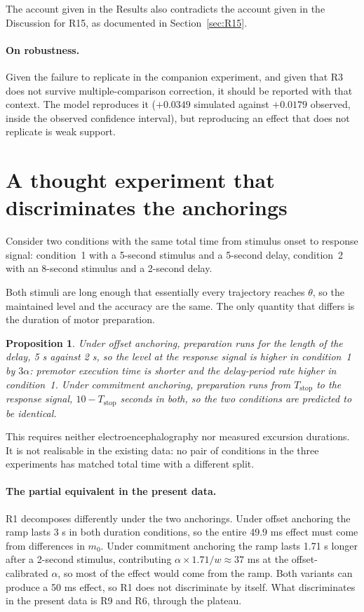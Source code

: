 \documentclass[11pt,a4paper]{article}
\newcommand{\Tstop}{T_{\text{stop}}}
\theoremstyle{plain}
\newtheorem{proposition}{Proposition}
\theoremstyle{remark}
\begin{document}
The account given in the Results also contradicts the account given in the Discussion for
R15, as documented in Section~\ref{sec:R15}.

\paragraph{On robustness.} Given the failure to replicate in the companion experiment, and
given that R3 does not survive multiple-comparison correction, it should be reported with
that context. The model reproduces it ($+0.0349$ simulated against $+0.0179$ observed,
inside the observed confidence interval), but reproducing an effect that does not replicate
is weak support.

\section{A thought experiment that discriminates the anchorings}
\label{sec:thought}

Consider two conditions with the same total time from stimulus onset to response signal:
condition~1 with a 5-second stimulus and a 5-second delay, condition~2 with an 8-second
stimulus and a 2-second delay.

Both stimuli are long enough that essentially every trajectory reaches $\theta$, so the
maintained level and the accuracy are the same. The only quantity that differs is the
duration of motor preparation.

\begin{proposition}
\label{prop:thought}
Under offset anchoring, preparation runs for the length of the delay, 5 s against 2 s, so
the level at the response signal is higher in condition~1 by $3\alpha$: premotor execution
time is shorter and the delay-period rate higher in condition~1. Under commitment anchoring,
preparation runs from $\Tstop$ to the response signal, $10-\Tstop$ seconds in both, so the
two conditions are predicted to be identical.
\end{proposition}

This requires neither electroencephalography nor measured excursion durations. It is not
realisable in the existing data: no pair of conditions in the three experiments has matched
total time with a different split.

\paragraph{The partial equivalent in the present data.} R1 decomposes differently under the
two anchorings. Under offset anchoring the ramp lasts 3 s in both duration conditions, so the
entire 49.9 ms effect must come from differences in $m_0$. Under commitment anchoring the
ramp lasts 1.71 s longer after a 2-second stimulus, contributing $\alpha\times1.71/w\approx
37$ ms at the offset-calibrated $\alpha$, so most of the effect would come from the ramp.
Both variants can produce a 50 ms effect, so R1 does not discriminate by itself. What
discriminates in the present data is R9 and R6, through the plateau.
\end{document}
